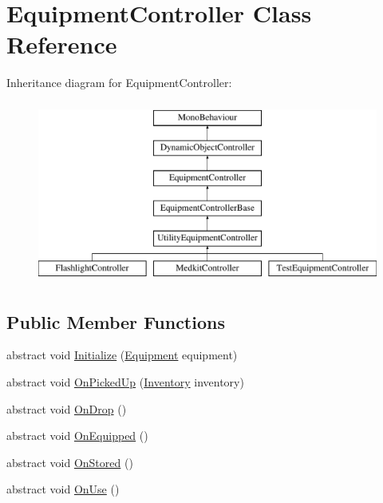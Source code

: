 \hypertarget{class_equipment_controller}{}\section{Equipment\+Controller Class Reference}
\label{class_equipment_controller}
Inheritance diagram for Equipment\+Controller\+:\begin{figure}[H]
\begin{center}
\leavevmode
\includegraphics[height=6.000000cm]{class_equipment_controller}
\end{center}
\end{figure}
\subsection*{Public Member Functions}
\begin{DoxyCompactItemize}
\item 
abstract void \mbox{\hyperlink{class_equipment_controller_a7eeee15beb95a3111424c83de2aa809b}{Initialize}} (\mbox{\hyperlink{class_equipment}{Equipment}} equipment)
\item 
abstract void \mbox{\hyperlink{class_equipment_controller_a4e0b167b8b3365bb6711b19195143fb6}{On\+Picked\+Up}} (\mbox{\hyperlink{class_inventory}{Inventory}} inventory)
\item 
abstract void \mbox{\hyperlink{class_equipment_controller_a27bdee4dd8690d8f72a7c7941104bb83}{On\+Drop}} ()
\item 
abstract void \mbox{\hyperlink{class_equipment_controller_acba8245d13e2339ef752de1945e21752}{On\+Equipped}} ()
\item 
abstract void \mbox{\hyperlink{class_equipment_controller_a93e833692f74ffcda9f56f15e5f4e63d}{On\+Stored}} ()
\item 
abstract void \mbox{\hyperlink{class_equipment_controller_ad15c45b6812eaefdaf26636ed8c45ab4}{On\+Use}} ()
\end{DoxyCompactItemize}
